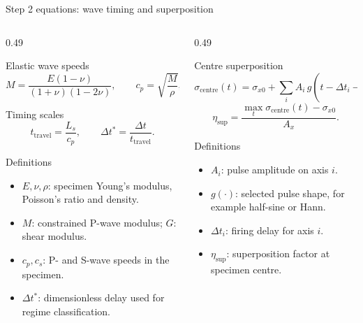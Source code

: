 \documentclass[11pt,aspectratio=169]{beamer}
\begin{document}
\begin{frame}{Step 2 equations: wave timing and superposition}
  \scriptsize
  \begin{columns}[T,onlytextwidth]
    \begin{column}{0.49\textwidth}
      \begin{block}{Elastic wave speeds}
        \[
          M=\frac{E(1-\nu)}{(1+\nu)(1-2\nu)},\qquad
          c_p=\sqrt{\frac{M}{\rho}},\qquad
          c_s=\sqrt{\frac{G}{\rho}} .
        \]
      \end{block}
      \begin{block}{Timing scales}
        \[
          t_{\mathrm{travel}}=\frac{L_s}{c_p},\qquad
          \Delta t^\ast=\frac{\Delta t}{t_{\mathrm{travel}}}.
        \]
      \end{block}
      \begin{block}{Definitions}
        \begin{itemize}
          \item $E,\nu,\rho$: specimen Young's modulus, Poisson's ratio and density.
          \item $M$: constrained P-wave modulus; $G$: shear modulus.
          \item $c_p,c_s$: P- and S-wave speeds in the specimen.
          \item $\Delta t^\ast$: dimensionless delay used for regime classification.
        \end{itemize}
      \end{block}
    \end{column}
    \begin{column}{0.49\textwidth}
      \begin{exampleblock}{Centre superposition}
        \[
          \sigma_{\mathrm{centre}}(t)
          =\sigma_{x0}+
          \sum_i A_i\,g\!\left(t-\Delta t_i-\frac{L_s}{2c_p}\right).
        \]
        \[
          \eta_{\mathrm{sup}}=
          \frac{\max_t\sigma_{\mathrm{centre}}(t)-\sigma_{x0}}{A_x}.
        \]
      \end{exampleblock}
      \begin{block}{Definitions}
        \begin{itemize}
          \item $A_i$: pulse amplitude on axis $i$.
          \item $g(\cdot)$: selected pulse shape, for example half-sine or Hann.
          \item $\Delta t_i$: firing delay for axis $i$.
          \item $\eta_{\mathrm{sup}}$: superposition factor at specimen centre.
        \end{itemize}
      \end{block}
    \end{column}
  \end{columns}
\end{frame}
\end{document}
